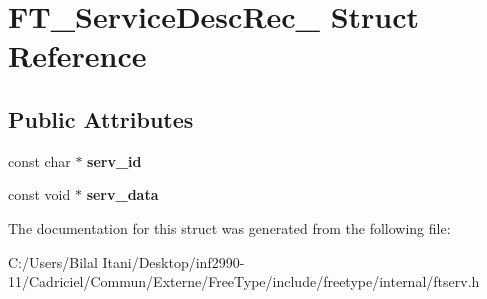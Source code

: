\hypertarget{struct_f_t___service_desc_rec__}{}\section{F\+T\+\_\+\+Service\+Desc\+Rec\+\_\+ Struct Reference}
\label{struct_f_t___service_desc_rec__}
\subsection*{Public Attributes}
\begin{DoxyCompactItemize}
\item 
const char $\ast$ {\bfseries serv\+\_\+id}\hypertarget{struct_f_t___service_desc_rec___ab706270db01e1398233571f10bd249d4}{}\label{struct_f_t___service_desc_rec___ab706270db01e1398233571f10bd249d4}

\item 
const void $\ast$ {\bfseries serv\+\_\+data}\hypertarget{struct_f_t___service_desc_rec___aa597a33a2b0d099ec32882dc6aa38d59}{}\label{struct_f_t___service_desc_rec___aa597a33a2b0d099ec32882dc6aa38d59}

\end{DoxyCompactItemize}


The documentation for this struct was generated from the following file\+:\begin{DoxyCompactItemize}
\item 
C\+:/\+Users/\+Bilal Itani/\+Desktop/inf2990-\/11/\+Cadriciel/\+Commun/\+Externe/\+Free\+Type/include/freetype/internal/ftserv.\+h\end{DoxyCompactItemize}
